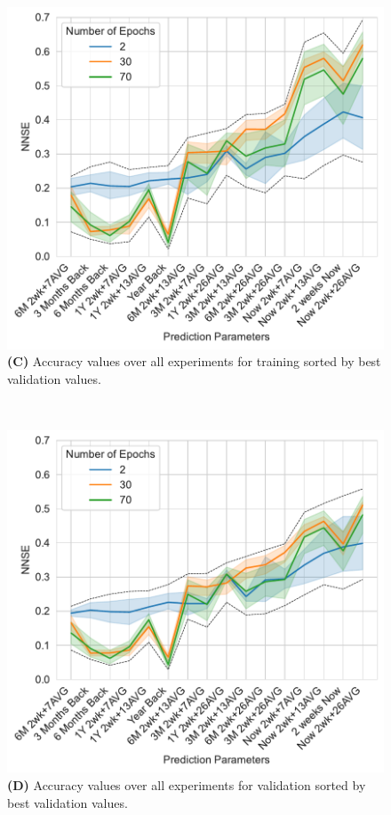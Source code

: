 \documentclass[utf8]{FrontiersinVancouver} %
\begin{document}
\begin{figure}[p]
\begin{center}
\begin{minipage}[t]{0.49\textwidth}
     \end{minipage}
  \ \
     \begin{minipage}[t]{0.49\textwidth}
        \includegraphics[width=1.0\linewidth]{images/A100-NNSE-all-epochs-training-min-max}
        {\bf (C)} Accuracy values over all experiments for training sorted by best validation values.
     \end{minipage}
  \ \
     \begin{minipage}[t]{0.49\textwidth}
        \includegraphics[width=1.0\linewidth]{images/A100-NNSE-all-epochs-validation-min-max}
        {\bf (D)} Accuracy values over all experiments for validation sorted by best validation values.
     \end{minipage}


\end{center}
\end{figure}
\end{document}
